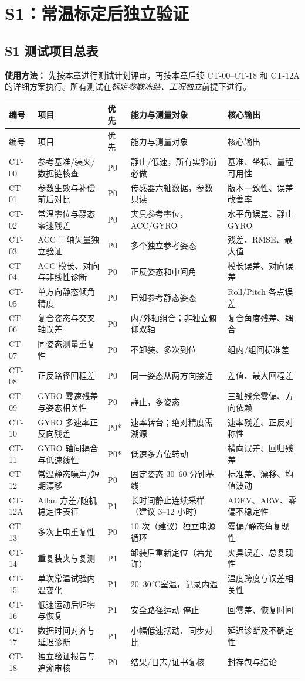 \chapter{S1：常温标定后独立验证}
\section{S1 测试项目总表}
\noindent\textbf{使用方法：} 先按本章进行测试计划评审，再按本章后续 CT-00--CT-18 和 CT-12A 的详细方案执行。所有测试在\emph{标定参数冻结、工况独立}前提下进行。
\small
\begin{longtable}{C{14mm}p{37mm}C{10mm}p{43mm}p{37mm}}
\toprule
编号 & 项目 & 优先 & 能力与测量对象 & 核心输出\\\midrule\endfirsthead
\toprule 编号 & 项目 & 优先 & 能力与测量对象 & 核心输出\\\midrule\endhead
CT-00 & 参考基准/装夹/数据链核查 & P0 & 静止/低速，所有实验前必做 & 基准、坐标、量程可用性\\
CT-01 & 参数生效与补偿前后对比 & P0 & 传感器六轴数据，参数只读 & 版本一致性、误差改善率\\
CT-02 & 常温零位与静态零速残差 & P0 & 夹具参考零位，ACC/GYRO & 水平角误差、静止 GYRO\\
CT-03 & ACC 三轴矢量独立验证 & P0 & 多个独立参考姿态 & 残差、RMSE、最大值\\
CT-04 & ACC 模长、对向与非线性诊断 & P0 & 正反姿态和中间角 & 模长误差、对向误差\\
CT-05 & 单方向静态倾角精度 & P0 & 已知参考静态姿态 & Roll/Pitch 各点误差\\
CT-06 & 复合姿态与交叉轴误差 & P0 & 内/外轴组合；非独立俯仰双轴 & 复合角度残差、耦合\\
CT-07 & 同姿态测量重复性 & P0 & 不卸装、多次到位 & 组内/组间标准差\\
CT-08 & 正反路径回程差 & P0 & 同一姿态从两方向接近 & 差值、最大回程差\\
CT-09 & GYRO 零速残差与姿态相关性 & P0 & 静止，多姿态 & 三轴残余零偏、方向依赖\\
CT-10 & GYRO 多速率正反向残差 & P0* & 速率转台；绝对精度需溯源 & 速率残差、正反对称性\\
CT-11 & GYRO 轴间耦合与低速线性 & P0* & 低速多方位转动 & 横向误差、回归残差\\
CT-12 & 常温静态噪声/短期漂移 & P0 & 固定姿态 30--60 分钟基线 & 标准差、漂移、均值波动\\
CT-12A & Allan 方差/随机稳定性表征 & P1 & 长时间静止连续采样（建议 3--12 小时） & ADEV、ARW、零偏不稳定性\\
CT-13 & 多次上电重复性 & P0 & 10 次（建议）独立电源循环 & 零偏/静态角复现性\\
CT-14 & 重复装夹与复测 & P1 & 卸装后重新定位（若允许） & 夹具误差、总复现性\\
CT-15 & 单次常温试验内温变化 & P1 & 20--30\,℃室温，记录内温 & 温度跨度与误差相关性\\
CT-16 & 低速运动后归零与恢复 & P1 & 安全路径运动-停止 & 回零差、恢复时间\\
CT-17 & 数据时间对齐与延迟诊断 & P1 & 小幅低速摆动、同步对比 & 延迟诊断及不确定性\\
CT-18 & 独立验证报告与追溯审核 & P0 & 结果/日志/证书复核 & 封存包与结论\\\bottomrule
\end{longtable}
